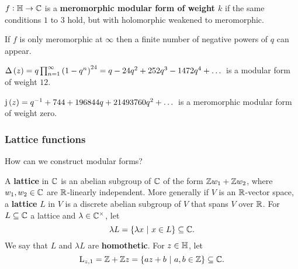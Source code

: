 
\begin{definition}
$ f : \mathbb{H} \to \mathbb{C} $ is a \textbf{meromorphic modular form of weight $ k $} if the same conditions $ 1 $ to $ 3 $ hold, but with holomorphic weakened to meromorphic.
\end{definition}

\begin{note*}
If $ f $ is only meromorphic at $ \infty $ then a finite number of negative powers of $ q $ can appear.
\end{note*}

\begin{example*}
$ \Delta\br{z} = q\prod_{n = 1}^\infty \br{1 - q^n}^{24} = q - 24q^2 + 252q^3 - 1472q^4 + \dots $ is a modular form of weight $ 12 $.
\end{example*}

\begin{example*}
$ \j\br{z} = q^{-1} + 744 + 196844q + 21493760q^2 + \dots $ is a meromorphic modular form of weight zero.
\end{example*}

\subsubsection{Lattice functions}

How can we construct modular forms?

\begin{definition}
A \textbf{lattice} in $ \mathbb{C} $ is an abelian subgroup of $ \mathbb{C} $ of the form $ \mathbb{Z} w_1 + \mathbb{Z} w_2 $, where $ w_1, w_2 \in \mathbb{C} $ are $ \mathbb{R} $-linearly independent. More generally if $ V $ is an $ \mathbb{R} $-vector space, a \textbf{lattice} $ L $ in $ V $ is a discrete abelian subgroup of $ V $ that spans $ V $ over $ \mathbb{R} $. For $ L \subseteq \mathbb{C} $ a lattice and $ \lambda \in \mathbb{C}^\times $, let
$$ \lambda L = \cbr{\lambda x \st x \in L} \subseteq \CC. $$
We say that $ L $ and $ \lambda L $ are \textbf{homothetic}. For $ z \in \mathbb{H} $, let
$$ \L_{z, 1} = \ZZ + \ZZ z = \cbr{az + b \st a, b \in \ZZ} \subseteq \CC. $$
\end{definition}

